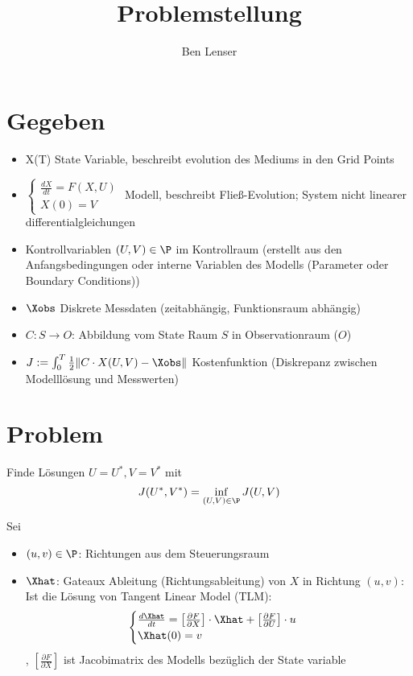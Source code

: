 \documentclass{article}
\title{Problemstellung}
\author{Ben Lenser}
\begin{document}
\maketitle



\section{Gegeben}
\begin{itemize}
	\item X(T)  State Variable, beschreibt evolution des Mediums in den Grid Points
	\item $\begin{cases}
						\frac{dX}{dt} = F(X,U)\\
					  X(0) = V
					 \end{cases}$
					Modell, beschreibt Fließ-Evolution; System nicht linearer differentialgleichungen
	\item Kontrollvariablen $(U,V)\in \P$ im Kontrollraum (erstellt aus den Anfangsbedingungen oder interne Variablen des Modells (Parameter oder Boundary Conditions))
	\item $\Xobs$ Diskrete Messdaten (zeitabhängig, Funktionsraum abhängig)
	\item $C:S\to O$: Abbildung vom State Raum $S$ in Observationraum ($O$)
	\item $J:= \int_0^T \frac{1}{2} \|C\cdot X(U,V) - \Xobs \|$ Kostenfunktion (Diskrepanz zwischen Modelllösung und Messwerten)
\end{itemize}

\section{Problem}
\begin{ass}
	Finde Lösungen $U=U^*, V=V^*$ mit
	\[ J(U^*,V^*) = \inf_{(U,V)\in \P}J(U,V)\]
	\end{ass}
Sei 
\begin{itemize}
	\item $(u,v) \in \P$: Richtungen aus dem Steuerungsraum
	\item $\Xhat$: Gateaux Ableitung (Richtungsableitung) von $X$ in Richtung $(u,v)$: Ist die Lösung von Tangent Linear Model (TLM):
	\[
		\begin{cases}
				\frac{d\Xhat}{dt} =\left[ \frac{\partial F}{\partial X}\right]\cdot \Xhat +  \left[ \frac{\partial F}{\partial U}\right] \cdot u\\
				\Xhat(0) = v
		\end{cases}
	\], $\left[ \frac{\partial F}{\partial X}\right]$ ist Jacobimatrix des Modells bezüglich der State variable
\end{itemize}
\end{document}
